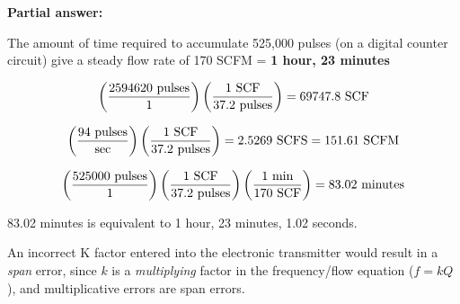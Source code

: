 





\noindent
{\bf Partial answer:}

\vskip 10pt

The amount of time required to accumulate 525,000 pulses (on a digital counter circuit) give a steady flow rate of 170 SCFM = {\bf 1 hour, 23 minutes}







$$\left({2594620 \hbox{ pulses} \over 1} \right) \left( {1 \hbox{ SCF} \over 37.2 \hbox{ pulses}} \right) = 69747.8 \hbox{ SCF}$$

\vskip 10pt

$$\left( {94 \hbox{ pulses} \over \hbox{sec}} \right) \left( {1 \hbox{ SCF} \over 37.2 \hbox{ pulses}} \right) = 2.5269 \hbox{ SCFS} = 151.61 \hbox{ SCFM}$$

\vskip 10pt

$$\left( {525000 \hbox{ pulses} \over 1} \right) \left( {1 \hbox{ SCF} \over 37.2 \hbox{ pulses}} \right) \left( {1 \hbox{ min} \over 170 \hbox{ SCF}} \right) = 83.02 \hbox{ minutes}$$

83.02 minutes is equivalent to 1 hour, 23 minutes, 1.02 seconds.

\vskip 10pt

An incorrect K factor entered into the electronic transmitter would result in a {\it span} error, since $k$ is a {\it multiplying} factor in the frequency/flow equation ($f = kQ$), and multiplicative errors are span errors.





